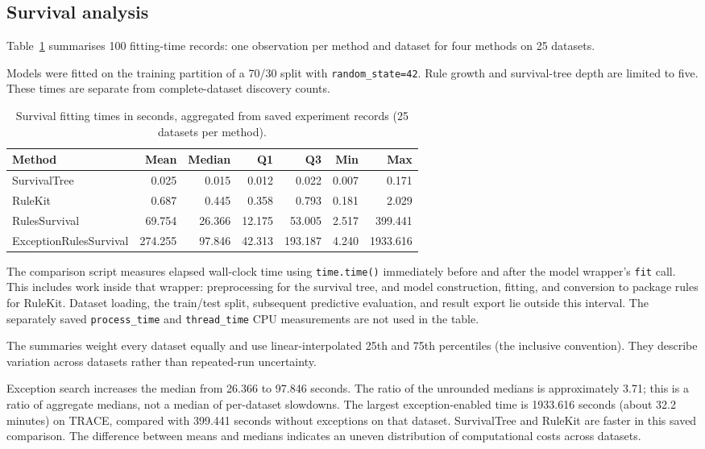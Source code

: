 \subsection{Survival analysis}
\label{execution-times-1}
Table~\ref{tab:survival-fitting-times} summarises 100 fitting-time records:
one observation per method and dataset for four methods on 25 datasets.

Models were fitted on the training partition of a 70/30 split
with \texttt{random\_state=42}. Rule growth and survival-tree depth are limited
to five. These times are separate from complete-dataset discovery counts.

\begin{table}[htbp]
\centering
\small
\setlength{\tabcolsep}{4pt}
\caption{Survival fitting times in seconds, aggregated from saved experiment records (25 datasets per method).}
\label{tab:survival-fitting-times}
\begin{tabularx}{\linewidth}{@{}Xrrrrrr@{}}
\toprule
Method & Mean & Median & Q1 & Q3 & Min & Max \\
\midrule
SurvivalTree & 0.025 & 0.015 & 0.012 & 0.022 & 0.007 & 0.171 \\
RuleKit & 0.687 & 0.445 & 0.358 & 0.793 & 0.181 & 2.029 \\
RulesSurvival & 69.754 & 26.366 & 12.175 & 53.005 & 2.517 & 399.441 \\
ExceptionRulesSurvival & 274.255 & 97.846 & 42.313 & 193.187 & 4.240 & 1933.616 \\
\bottomrule
\end{tabularx}
\end{table}

The comparison script measures elapsed wall-clock time using \texttt{time.time()}
immediately before and after the model wrapper's \texttt{fit} call. This includes
work inside that wrapper: preprocessing for the survival tree, and model
construction, fitting, and conversion to package rules for RuleKit. Dataset
loading, the train/test split, subsequent predictive evaluation, and result
export lie outside this interval. The separately saved \texttt{process\_time} and
\texttt{thread\_time} CPU measurements are not used in the table.

The summaries weight every dataset equally and use linear-interpolated 25th
and 75th percentiles (the inclusive convention). They describe variation across
datasets rather than repeated-run uncertainty.

Exception search increases the median from 26.366 to 97.846 seconds. The ratio
of the unrounded medians is approximately 3.71; this is a ratio of aggregate
medians, not a median of per-dataset slowdowns. The largest exception-enabled
time is 1933.616 seconds (about 32.2 minutes) on TRACE, compared with 399.441
seconds without exceptions on that dataset. SurvivalTree and RuleKit are
faster in this saved comparison. The difference between means and medians
indicates an uneven distribution of computational costs across datasets.



